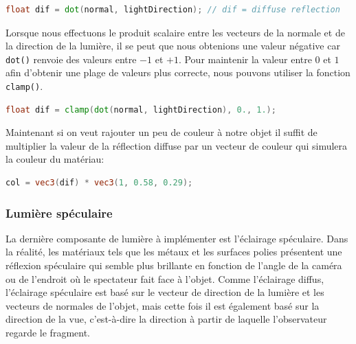 \begin{minipage}{\linewidth}
\begin{lstlisting}[language=GLSL, caption=Quantité de lumière diffuse,captionpos=b,frame=single]
float dif = dot(normal, lightDirection); // dif = diffuse reflection
\end{lstlisting}
\end{minipage}

Lorsque nous effectuons le produit scalaire entre les vecteurs de la normale et de la direction de la lumière, il se peut que nous obtenions une valeur négative car \lstinline{dot()} renvoie des valeurs entre $-1$ et $+1$. Pour maintenir la valeur entre $0$ et $1$ afin d'obtenir une plage de valeurs plus correcte, nous pouvons utiliser la fonction \lstinline{clamp()}.

\begin{minipage}{\linewidth}
\begin{lstlisting}[language=GLSL, caption=\lstinline{clamp()} sur diffuse,captionpos=b,frame=single]
float dif = clamp(dot(normal, lightDirection), 0., 1.);
\end{lstlisting}
\end{minipage}

Maintenant si on veut rajouter un peu de couleur à notre objet il suffit de multiplier la valeur de la réflection diffuse par un vecteur de couleur qui simulera la couleur du matériau:

\begin{minipage}{\linewidth}
\begin{lstlisting}[language=GLSL, caption=Couleur diffuse,captionpos=b,frame=single]
col = vec3(dif) * vec3(1, 0.58, 0.29);
\end{lstlisting}
\end{minipage}


\subsubsection*{Lumière spéculaire}

La dernière composante de lumière à implémenter est l'éclairage spéculaire. Dans la réalité, les matériaux tels que les métaux et les surfaces polies présentent une réflexion spéculaire qui semble plus brillante en fonction de l'angle de la caméra ou de l'endroit où le spectateur fait face à l'objet. Comme l'éclairage diffus, l'éclairage spéculaire est basé sur le vecteur de direction de la lumière et les vecteurs de normales de l'objet, mais cette fois il est également basé sur la direction de la vue, c'est-à-dire la direction à partir de laquelle l'observateur regarde le fragment.

